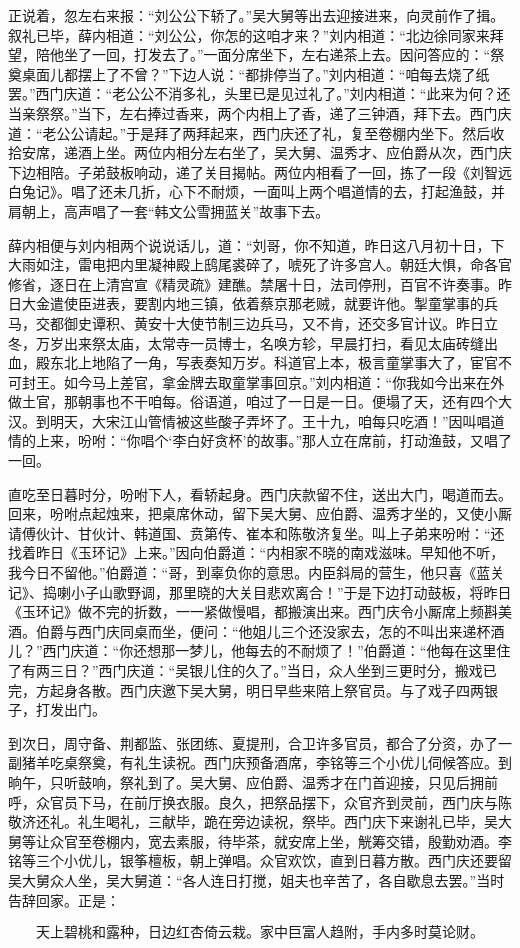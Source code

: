 正说着，忽左右来报：“刘公公下轿了。”吴大舅等出去迎接进来，向灵前作了揖。叙礼已毕，薛内相道：“刘公公，你怎的这咱才来？”刘内相道：“北边徐同家来拜望，陪他坐了一回，打发去了。”一面分席坐下，左右递茶上去。因问答应的：“祭奠桌面儿都摆上了不曾？”下边人说：“都排停当了。”刘内相道：“咱每去烧了纸罢。”西门庆道：“老公公不消多礼，头里已是见过礼了。”刘内相道：“此来为何？还当亲祭祭。”当下，左右捧过香来，两个内相上了香，递了三钟酒，拜下去。西门庆道：“老公公请起。”于是拜了两拜起来，西门庆还了礼，复至卷棚内坐下。然后收拾安席，递酒上坐。两位内相分左右坐了，吴大舅、温秀才、应伯爵从次，西门庆下边相陪。子弟鼓板响动，递了关目揭帖。两位内相看了一回，拣了一段《刘智远白兔记》。唱了还未几折，心下不耐烦，一面叫上两个唱道情的去，打起渔鼓，并肩朝上，高声唱了一套“韩文公雪拥蓝关”故事下去。

薛内相便与刘内相两个说说话儿，道：“刘哥，你不知道，昨日这八月初十日，下大雨如注，雷电把内里凝神殿上鸱尾裘碎了，唬死了许多宫人。朝廷大惧，命各官修省，逐日在上清宫宣《精灵疏》建醮。禁屠十日，法司停刑，百官不许奏事。昨日大金遣使臣进表，要割内地三镇，依着蔡京那老贼，就要许他。掣童掌事的兵马，交都御史谭积、黄安十大使节制三边兵马，又不肯，还交多官计议。昨日立冬，万岁出来祭太庙，太常寺一员博士，名唤方轸，早晨打扫，看见太庙砖缝出血，殿东北上地陷了一角，写表奏知万岁。科道官上本，极言童掌事大了，宦官不可封王。如今马上差官，拿金牌去取童掌事回京。”刘内相道：“你我如今出来在外做土官，那朝事也不干咱每。俗语道，咱过了一日是一日。便塌了天，还有四个大汉。到明天，大宋江山管情被这些酸子弄坏了。王十九，咱每只吃酒！”因叫唱道情的上来，吩咐：“你唱个‘李白好贪杯’的故事。”那人立在席前，打动渔鼓，又唱了一回。

直吃至日暮时分，吩咐下人，看轿起身。西门庆款留不住，送出大门，喝道而去。回来，吩咐点起烛来，把桌席休动，留下吴大舅、应伯爵、温秀才坐的，又使小厮请傅伙计、甘伙计、韩道国、贲第传、崔本和陈敬济复坐。叫上子弟来吩咐：“还找着昨日《玉环记》上来。”因向伯爵道：“内相家不晓的南戏滋味。早知他不听，我今日不留他。”伯爵道：“哥，到辜负你的意思。内臣斜局的营生，他只喜《蓝关记》、捣喇小子山歌野调，那里晓的大关目悲欢离合！”于是下边打动鼓板，将昨日《玉环记》做不完的折数，一一紧做慢唱，都搬演出来。西门庆令小厮席上频斟美酒。伯爵与西门庆同桌而坐，便问：“他姐儿三个还没家去，怎的不叫出来递杯酒儿？”西门庆道：“你还想那一梦儿，他每去的不耐烦了！”伯爵道：“他每在这里住了有两三日？”西门庆道：“吴银儿住的久了。”当日，众人坐到三更时分，搬戏已完，方起身各散。西门庆邀下吴大舅，明日早些来陪上祭官员。与了戏子四两银子，打发出门。

到次日，周守备、荆都监、张团练、夏提刑，合卫许多官员，都合了分资，办了一副猪羊吃桌祭奠，有礼生读祝。西门庆预备酒席，李铭等三个小优儿伺候答应。到晌午，只听鼓响，祭礼到了。吴大舅、应伯爵、温秀才在门首迎接，只见后拥前呼，众官员下马，在前厅换衣服。良久，把祭品摆下，众官齐到灵前，西门庆与陈敬济还礼。礼生喝礼，三献毕，跪在旁边读祝，祭毕。西门庆下来谢礼已毕，吴大舅等让众官至卷棚内，宽去素服，待毕茶，就安席上坐，觥筹交错，殷勤劝酒。李铭等三个小优儿，银筝檀板，朝上弹唱。众官欢饮，直到日暮方散。西门庆还要留吴大舅众人坐，吴大舅道：“各人连日打搅，姐夫也辛苦了，各自歇息去罢。”当时告辞回家。正是：

\[
天上碧桃和露种，日边红杏倚云栽。
家中巨富人趋附，手内多时莫论财。
\]
